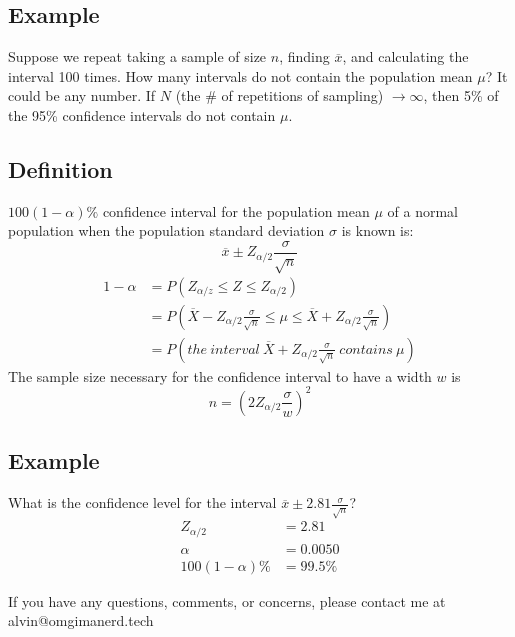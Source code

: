 \documentclass[letterpaper, 12pt]{math}
\begin{document}
\subsection*{Example}
Suppose we repeat taking a sample of size \( n \), finding \( \overline{x} \),
and calculating the interval 100 times. How many intervals do not contain the
population mean \( \mu \)? It could be any number. If \( N \) (the \# of
repetitions of sampling) \( \to\infty \), then 5\% of the 95\% confidence
intervals do not contain \( \mu \).

\subsection*{Definition}
\( 100(1-\alpha)\% \) confidence interval for the population mean \( \mu \) of
a normal population when the population standard deviation \( \sigma \) is known
is:
\[ \overline{x}\pm Z_{\alpha/2}\frac{\sigma}{\sqrt{n}} \]
\begin{align*}
  1-\alpha &= P(Z_{\alpha/z}\leq Z\leq Z_{\alpha/2}) \\
  &= P(\overline{X}-Z_{\alpha/2}\frac{\sigma}{\sqrt{n}}\leq \mu\leq
    \overline{X}+Z_{\alpha/2}\frac{\sigma}{\sqrt{n}}) \\
  &= P(the\ interval\ \overline{X}+Z_{\alpha/2}\frac{\sigma}{\sqrt{n}}
    \ contains\ \mu)
\end{align*}
The sample size necessary for the confidence interval to have a width \( w \)
is
\[ n = (2Z_{\alpha/2}\frac{\sigma}{w})^{2} \]

\subsection*{Example}
What is the confidence level for the interval \( \overline{x}\pm2.81
\frac{\sigma}{\sqrt{n}} \)?
\begin{align*}
  Z_{\alpha/2} &= 2.81 \\
  \alpha &= 0.0050 \\
  100(1-\alpha)\% &= 99.5\%
\end{align*}

\begin{center}
  If you have any questions, comments, or concerns, please contact me at
  alvin@omgimanerd.tech
\end{center}
\end{document}
